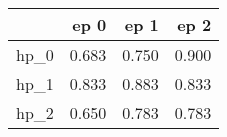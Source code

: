 \begin{tabular}{lrrr}
\toprule
{} &   ep 0 &   ep 1 &   ep 2 \\
\midrule
hp\_0 &  0.683 &  0.750 &  0.900 \\
hp\_1 &  0.833 &  0.883 &  0.833 \\
hp\_2 &  0.650 &  0.783 &  0.783 \\
\bottomrule
\end{tabular}
